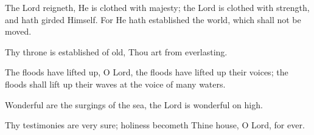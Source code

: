 The Lord reigneth, He is clothed with majesty; the Lord is clothed with strength, and hath girded Himself. For He hath established the world, which shall not be moved.

Thy throne is established of old, Thou art from everlasting.

The floods have lifted up, O Lord, the floods have lifted up their voices; the floods shall lift up their waves at the voice of many waters.

Wonderful are the surgings of the sea, the Lord is wonderful on high.

Thy testimonies are very sure; holiness becometh Thine house, O Lord, for ever.

